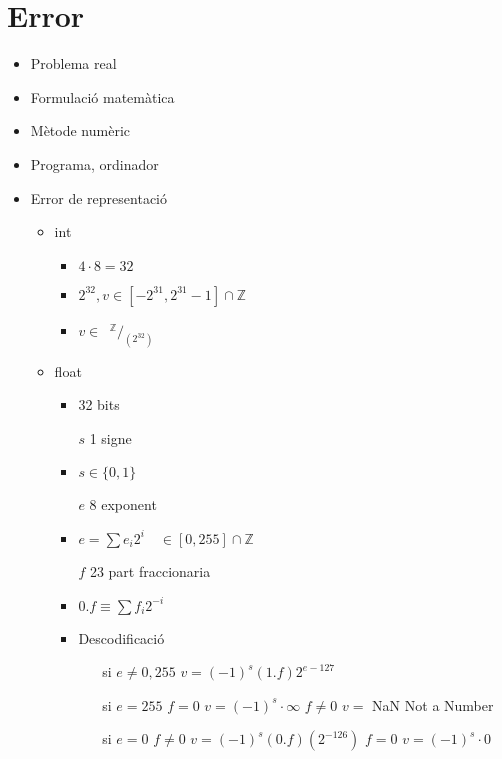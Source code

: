 \documentclass[a4paper,10pt]{article}
\newcommand{\blue}[1]{{\color{blue}#1}}
\newcommand{\Z}{\mathds{Z}}
\begin{document}
\section{Error}
\begin{itemize}
\item Problema real
\item Formulació matemàtica
\item Mètode numèric
\item Programa, ordinador
\item Error de representació
	\begin{itemize}
	\item int
		\begin{itemize}
		\item $4\cdot 8 = 32$
		\item $2^{32}, v \in [-2^{31}, 2^{31}-1] \cap \Z$
		\item $v \in \phantom{a}^\Z\! / _{(2^{32})}$
		\end{itemize}
	\item float
		\begin{itemize}
		\item 32 bits
		\item[$s$] 1 signe
		\item $s \in \{0, 1\}$
		\item[$e$] 8 exponent
		\item $e = \sum e_i 2^i \quad \in [0, 255] \cap \Z$
		\item[$f$] 23 part fraccionaria
		\item $0.f \equiv \sum f_i2^{-i}$
		\item Descodificació
			\begin{itemize}
			\item[si] $e \neq 0, 255$
				\subitem $v = (-1)^s (1.f)2^{e-127}$
			\item[si] $e = 255$
				\subitem[si] $f = 0$
					\subsubitem $v = (-1)^s \cdot \infty$
				\subitem[si] $f \neq 0$
					\subsubitem $v =$ NaN \blue{Not a Number}
			\item[si] $e = 0$
				\subitem[si] $f \neq 0$
					\subsubitem $v = (-1)^s(0.f)(2^{-126})$
				\subitem[si] $f = 0$
					\subsubitem $v = (-1)^s \cdot 0$
			\end{itemize}
		\end{itemize}
	\end{itemize}
\end{itemize}
\end{document}

